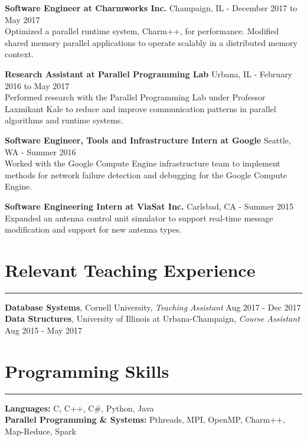 \documentclass[10pt]{article}
\newcommand{\leftrightrow}[2]{
	#1 \hfill #2 \\
}
\newcommand{\teachblock}[2]{
	\leftrightrow{#1}{#2}
}
\newcommand{\workblock}[3]{
	\leftrightrow{\textbf{#1}}{#2}
    #3 \\
}
\begin{document}
\vspace{-0.8em}

\workblock{Software Engineer at Charmworks Inc.}{Champaign, IL - December 2017 to May 2017}{Optimized a parallel
runtime system, Charm++, for performance. Modified shared memory parallel applications to operate scalably in a distributed memory context.} 

\vspace{-0.8em}

\workblock{Research Assistant at Parallel Programming Lab}{Urbana, IL - February 2016 to May 2017}{Performed research with the Parallel Programming Lab under Professor Laxmikant Kale to reduce and improve communication patterns in parallel algorithms and runtime systems.}

\vspace{-0.8em}

\workblock{Software Engineer, Tools and Infrastructure Intern at Google} {Seattle, WA - Summer 2016}{Worked with the Google Compute Engine infrastructure team to implement methods for network failure detection and debugging for the Google Compute Engine.}

\vspace{-0.8em}

\workblock{Software Engineering Intern at ViaSat Inc.} {Carlsbad, CA - Summer 2015}{Expanded an antenna control unit simulator to support real-time message modification and support for new antenna types.}

\vspace{-0.8em}

\section{Relevant Teaching Experience}
\hrule \vspace{0.4em}
\teachblock{\textbf{Database Systems}, Cornell University, \textit{Teaching Assistant}}{Aug 2017 - Dec 2017}
\teachblock{\textbf{Data Structures}, University of Illinois at Urbana-Champaign, \textit{Course Assistant}}{Aug 2015 - May 2017}

\vspace{-0.8em}

\section{Programming Skills}
\hrule \vspace{0.4em}
\textbf{Languages:} C, C++, C\#, Python, Java \\
\textbf{Parallel Programming \& Systems:} Pthreads, MPI, OpenMP, Charm++, Map-Reduce, Spark
\end{document}
